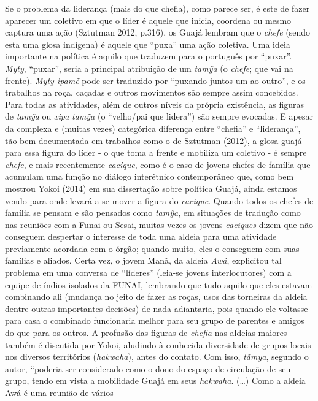 Se o problema da liderança (mais do que chefia), como parece ser, é este
de fazer aparecer um coletivo em que o líder é aquele que inicia,
coordena ou mesmo captura uma ação (Sztutman 2012, p.316), os Guajá
lembram que o \emph{chefe} (sendo esta uma glosa indígena) é aquele que
``puxa'' uma ação coletiva. Uma ideia importante na política é aquilo
que traduzem para o português por ``puxar''. \emph{Myty}, ``puxar'',
seria a principal atribuição de um \emph{tamỹa} (o \emph{chefe}; que vai
na frente). \emph{Myty ipamẽ} pode ser traduzido por ``puxando juntos um
ao outro'', e os trabalhos na roça, caçadas e outros movimentos são
sempre assim concebidos. Para todas as atividades, além de outros níveis
da própria existência, as figuras de \emph{tamỹa} ou \emph{xipa}
\emph{tamỹa} (o ``velho/pai que lidera'') são sempre evocadas. E apesar
da complexa e (muitas vezes) categórica diferença entre ``chefia'' e
``liderança'', tão bem documentada em trabalhos como o de Sztutman
(2012), a glosa guajá para essa figura do líder - o que toma a frente e
mobiliza um coletivo - é sempre \emph{chefe}, e mais recentemente
\emph{cacique}, como é o caso de jovens chefes de família que acumulam
uma função no diálogo interétnico contemporâneo que, como bem mostrou
Yokoi (2014) em sua dissertação sobre política Guajá, ainda estamos
vendo para onde levará a se mover a figura do \emph{cacique}. Quando
todos os chefes de família se pensam e são pensados como \emph{tamỹa},
em situações de tradução como nas reuniões com a Funai ou Sesai, muitas
vezes os jovens \emph{caciques} dizem que não conseguem despertar o
interesse de toda uma aldeia para uma atividade previamente acordada com
o órgão; quando muito, eles o conseguem com suas famílias e aliados.
Certa vez, o jovem Manã, da aldeia \emph{Awá}, explicitou tal problema
em uma conversa de ``líderes'' (leia-se jovens interlocutores) com a
equipe de índios isolados da FUNAI, lembrando que tudo aquilo que eles
estavam combinando ali (mudança no jeito de fazer as roças, usos das
torneiras da aldeia dentre outras importantes decisões) de nada
adiantaria, pois quando ele voltasse para casa o combinado funcionaria
melhor para seu grupo de parentes e amigos do que para os outros. A
profusão das figuras de \emph{chefia} nas aldeias maiores também é
discutida por Yokoi, aludindo à conhecida diversidade de grupos locais
nos diversos territórios (\emph{hakwaha}), antes do contato. Com isso,
\emph{tãmya}, segundo o autor, ``poderia ser considerado como o dono do
espaço de circulação de seu grupo, tendo em vista a mobilidade Guajá em
seus \emph{hakwaha}. (\ldots{}) Como a aldeia Awá é uma reunião de vários
